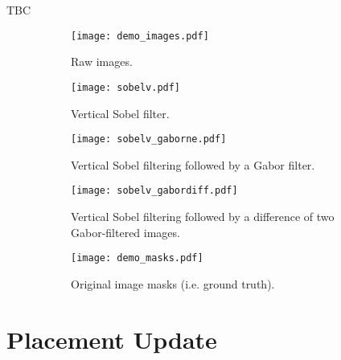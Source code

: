 \documentclass[11pt]{article} %
\begin{document}
TBC

\begin{figure}
\centering
  	 \begin{subfigure}[b]{1\textwidth}
   	\texttt{[image: demo\_images.pdf]}
   	\caption{Raw images.}
   	\label{fig:a} 
	\end{subfigure}

  	 \begin{subfigure}[b]{1\textwidth}
   	\texttt{[image: sobelv.pdf]}
   	\caption{Vertical Sobel filter.}
   	\label{fig:b} 
	\end{subfigure}
	
  	 \begin{subfigure}[b]{1\textwidth}
   	\texttt{[image: sobelv\_gaborne.pdf]}
   	\caption{Vertical Sobel filtering followed by a Gabor filter.}
   	\label{fig:d} 
	\end{subfigure}
	
  	 \begin{subfigure}[b]{1\textwidth}
   	\texttt{[image: sobelv\_gabordiff.pdf]}
   	\caption{Vertical Sobel filtering followed by a difference of two Gabor-filtered images.}
   	\label{fig:f} 
	\end{subfigure}
	
	\begin{subfigure}[b]{1\textwidth}
   	\texttt{[image: demo\_masks.pdf]}
   	\caption{Original image masks (i.e. ground truth).}
   	\label{fig:f} 
	\end{subfigure}
\caption{}
\end{figure}


\newpage
\section*{Placement Update}
\end{document}
